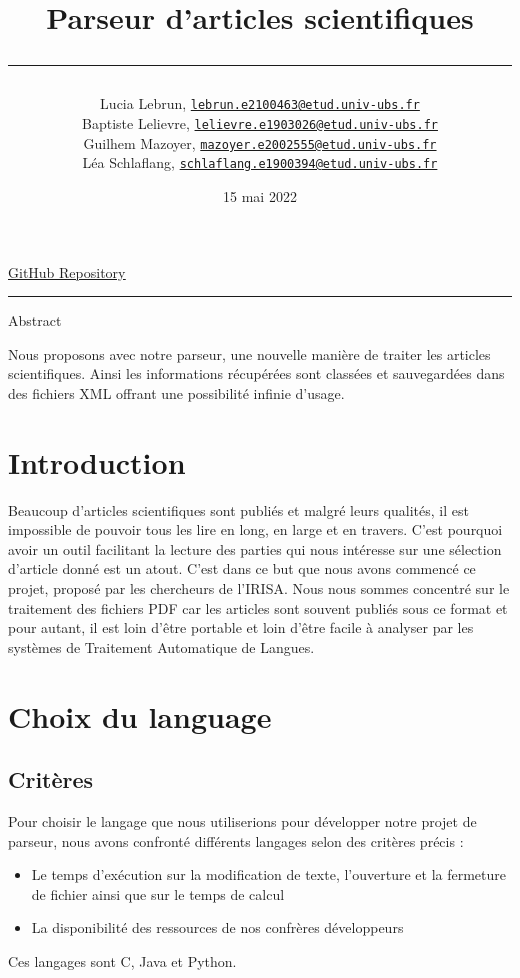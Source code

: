 \documentclass[12pt, final]{article}
\title{{\fonttitle Parseur d'articles scientifiques 
    \par\noindent\rule{\textwidth}{0.4pt}}}
\author{Lucia Lebrun, \texttt{\href{mailto:lebrun.e2100463@etud.univ-ubs.fr}{lebrun.e2100463@etud.univ-ubs.fr}}
    \\ Baptiste Lelievre, \texttt{\href{mailto:lelievre.e1903026@etud.univ-ubs.fr}{lelievre.e1903026@etud.univ-ubs.fr}}
    \\ Guilhem Mazoyer, \texttt{\href{mailto:mazoyer.e2002555@etud.univ-ubs.fr}{mazoyer.e2002555@etud.univ-ubs.fr}}
    \\ Léa Schlaflang, \texttt{\href{mailto:schlaflang.e1900394@etud.univ-ubs.fr}{schlaflang.e1900394@etud.univ-ubs.fr}}}
\affil{Université Bretagne Sud, Vannes, France}
\date{15 mai 2022}
\begin{document}
    \maketitle
    
    \begin{center}
        \begin{fontsubsection}
            \href{https://github.com/guilhemmazoyer/Parseur_lbgl}{\underline{GitHub Repository}}
        \end{fontsubsection}
    \end{center}
    
    \par\noindent\rule{\textwidth}{0.4pt}
    \newpage{}
    
    \tableofcontents
    \newpage{}
        
    \begin{fontsection}Abstract\end{fontsection}\newline
    Nous proposons avec notre parseur, une nouvelle manière de traiter les articles scientifiques. Ainsi les informations récupérées sont classées et sauvegardées dans des fichiers XML offrant une possibilité infinie d'usage.
    
    \section{\fontsection Introduction}
    Beaucoup d'articles scientifiques sont publiés et malgré leurs qualités, il est impossible de pouvoir tous les lire en long, en large et en travers. C'est pourquoi avoir un outil facilitant la lecture des parties qui nous intéresse sur une sélection d'article donné est un atout. C'est dans ce but que nous avons commencé ce projet, proposé par les chercheurs de l'IRISA.\newline
    Nous nous sommes concentré sur le traitement des fichiers PDF car les articles sont souvent publiés sous ce format et pour autant, il est loin d’être portable et loin d’être facile à analyser par les systèmes de Traitement Automatique de Langues.
        
    \section{\fontsection Choix du language}
        \subsection{\fontsubsection Critères}
        Pour choisir le langage que nous utiliserions pour développer notre projet de parseur, nous avons confronté différents langages selon des critères précis :
        \begin{itemize}
            \item Le temps d'exécution sur la modification de texte, l'ouverture et la fermeture de fichier ainsi que sur le temps de calcul
            \item La disponibilité des ressources de nos confrères développeurs
        \end{itemize}
        Ces langages sont C, Java et Python.
\end{document}
